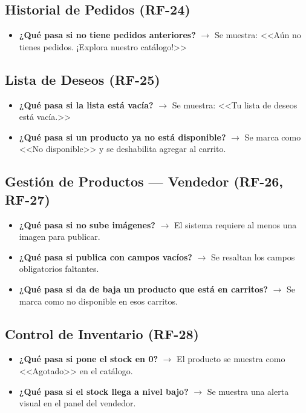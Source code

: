 \documentclass[12pt,a4paper]{article}
\begin{document}
\subsection{Historial de Pedidos (RF-24)}
\begin{itemize}
    \item \textbf{¿Qué pasa si no tiene pedidos anteriores?} $\rightarrow$ Se muestra: <<Aún no tienes pedidos. ¡Explora nuestro catálogo!>>
\end{itemize}

\subsection{Lista de Deseos (RF-25)}
\begin{itemize}
    \item \textbf{¿Qué pasa si la lista está vacía?} $\rightarrow$ Se muestra: <<Tu lista de deseos está vacía.>>
    \item \textbf{¿Qué pasa si un producto ya no está disponible?} $\rightarrow$ Se marca como <<No disponible>> y se deshabilita agregar al carrito.
\end{itemize}

\subsection{Gestión de Productos --- Vendedor (RF-26, RF-27)}
\begin{itemize}
    \item \textbf{¿Qué pasa si no sube imágenes?} $\rightarrow$ El sistema requiere al menos una imagen para publicar.
    \item \textbf{¿Qué pasa si publica con campos vacíos?} $\rightarrow$ Se resaltan los campos obligatorios faltantes.
    \item \textbf{¿Qué pasa si da de baja un producto que está en carritos?} $\rightarrow$ Se marca como no disponible en esos carritos.
\end{itemize}

\subsection{Control de Inventario (RF-28)}
\begin{itemize}
    \item \textbf{¿Qué pasa si pone el stock en 0?} $\rightarrow$ El producto se muestra como <<Agotado>> en el catálogo.
    \item \textbf{¿Qué pasa si el stock llega a nivel bajo?} $\rightarrow$ Se muestra una alerta visual en el panel del vendedor.
\end{itemize}
\end{document}
